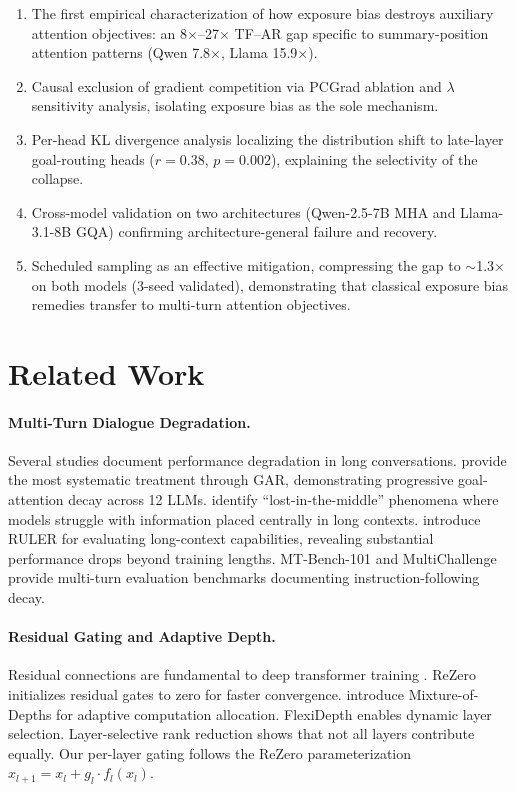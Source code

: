 \documentclass[11pt]{article}
\newcommand{\gar}{\textsc{GAR}}
\begin{document}
\begin{enumerate}
    \item The first empirical characterization of how exposure bias destroys auxiliary attention objectives: an 8$\times$--27$\times$ TF--AR gap specific to summary-position attention patterns (Qwen 7.8$\times$, Llama 15.9$\times$).
    \item Causal exclusion of gradient competition via PCGrad ablation and $\lambda$ sensitivity analysis, isolating exposure bias as the sole mechanism.
    \item Per-head KL divergence analysis localizing the distribution shift to late-layer goal-routing heads ($r=0.38$, $p=0.002$), explaining the selectivity of the collapse.
    \item Cross-model validation on two architectures (Qwen-2.5-7B MHA and Llama-3.1-8B GQA) confirming architecture-general failure and recovery.
    \item Scheduled sampling as an effective mitigation, compressing the gap to ${\sim}$1.3$\times$ on both models (3-seed validated), demonstrating that classical exposure bias remedies transfer to multi-turn attention objectives.
\end{enumerate}

\section{Related Work}

\paragraph{Multi-Turn Dialogue Degradation.}
Several studies document performance degradation in long conversations. \citet{dongre2026goal} provide the most systematic treatment through \gar{}, demonstrating progressive goal-attention decay across 12 LLMs. \citet{liu2024lost} identify ``lost-in-the-middle'' phenomena where models struggle with information placed centrally in long contexts. \citet{hsieh2024ruler} introduce RULER for evaluating long-context capabilities, revealing substantial performance drops beyond training lengths. MT-Bench-101 \citep{bai2024mtbench101} and MultiChallenge \citep{li2024multichallenge} provide multi-turn evaluation benchmarks documenting instruction-following decay.

\paragraph{Residual Gating and Adaptive Depth.}
Residual connections are fundamental to deep transformer training \citep{he2016deep}. ReZero \citep{bachlechner2021rezero} initializes residual gates to zero for faster convergence. \citet{raposo2024mixtureofdepths} introduce Mixture-of-Depths for adaptive computation allocation. FlexiDepth \citep{luo2025flexidepth} enables dynamic layer selection. Layer-selective rank reduction \citep{sharma2024truth} shows that not all layers contribute equally. Our per-layer gating follows the ReZero parameterization $x_{l+1} = x_l + g_l \cdot f_l(x_l)$.
\end{document}
